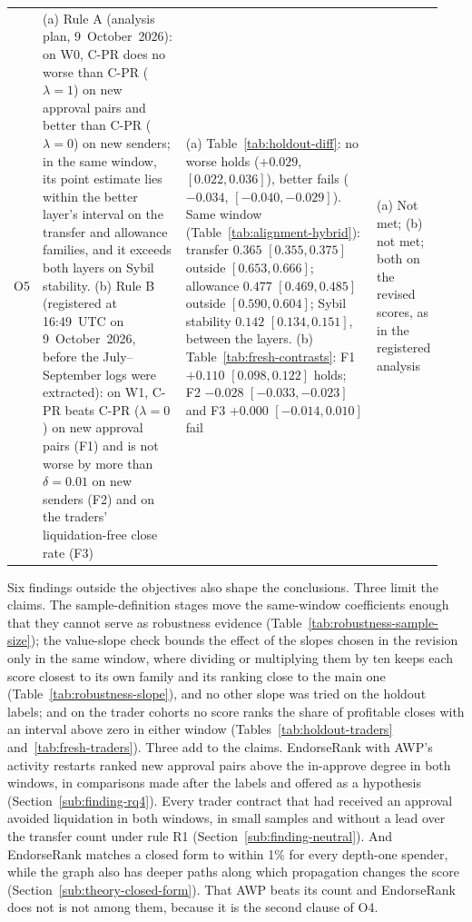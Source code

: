 \begin{longtable}{p{0.05\linewidth}p{0.33\linewidth}p{0.44\linewidth}p{0.12\linewidth}}
O5 & (a) Rule A (analysis plan, 9~October~2026): on W0, C-PR does no worse than C-PR ($\lambda=1$) on new approval pairs and better than C-PR ($\lambda=0$) on new senders; in the same window, its point estimate lies within the better layer's interval on the transfer and allowance families, and it exceeds both layers on Sybil stability. (b) Rule B (registered at 16:49~UTC on 9~October~2026, before the July--September logs were extracted): on W1, C-PR beats C-PR ($\lambda=0$) on new approval pairs (F1) and is not worse by more than $\delta=0.01$ on new senders (F2) and on the traders' liquidation-free close rate (F3) & (a) Table~\ref{tab:holdout-diff}: no worse holds ($+0.029$, $[0.022,0.036]$), better fails ($-0.034$, $[-0.040,-0.029]$). Same window (Table~\ref{tab:alignment-hybrid}): transfer $0.365$ $[0.355,0.375]$ outside $[0.653,0.666]$; allowance $0.477$ $[0.469,0.485]$ outside $[0.590,0.604]$; Sybil stability $0.142$ $[0.134,0.151]$, between the layers. (b) Table~\ref{tab:fresh-contrasts}: F1 $+0.110$ $[0.098,0.122]$ holds; F2 $-0.028$ $[-0.033,-0.023]$ and F3 $+0.000$ $[-0.014,0.010]$ fail & (a) Not met; (b) not met; both on the revised scores, as in the registered analysis \\
\end{longtable}
\endgroup

Six findings outside the objectives also shape the conclusions. Three limit the claims. The sample-definition stages move the same-window coefficients enough that they cannot serve as robustness evidence (Table~\ref{tab:robustness-sample-size}); the value-slope check bounds the effect of the slopes chosen in the revision only in the same window, where dividing or multiplying them by ten keeps each score closest to its own family and its ranking close to the main one (Table~\ref{tab:robustness-slope}), and no other slope was tried on the holdout labels; and on the trader cohorts no score ranks the share of profitable closes with an interval above zero in either window (Tables~\ref{tab:holdout-traders} and~\ref{tab:fresh-traders}). Three add to the claims. EndorseRank with AWP's activity restarts ranked new approval pairs above the in-approve degree in both windows, in comparisons made after the labels and offered as a hypothesis (Section~\ref{sub:finding-rq4}). Every trader contract that had received an approval avoided liquidation in both windows, in small samples and without a lead over the transfer count under rule R1 (Section~\ref{sub:finding-neutral}). And EndorseRank matches a closed form to within 1\% for every depth-one spender, while the graph also has deeper paths along which propagation changes the score (Section~\ref{sub:theory-closed-form}). That AWP beats its count and EndorseRank does not is not among them, because it is the second clause of O4.

